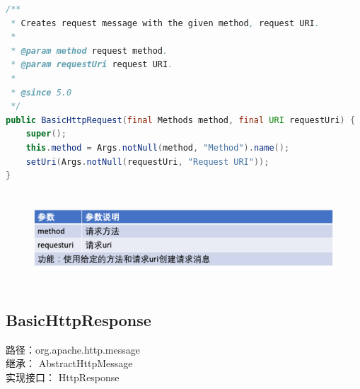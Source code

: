 \documentclass{article}
\begin{document}
	\begin{lstlisting}[language={java}]
/**
 * Creates request message with the given method, request URI.
 *
 * @param method request method.
 * @param requestUri request URI.
 *
 * @since 5.0
 */
public BasicHttpRequest(final Methods method, final URI requestUri) {
    super();
    this.method = Args.notNull(method, "Method").name();
    setUri(Args.notNull(requestUri, "Request URI"));
}

	\end{lstlisting}
	\begin{figure}[H]
		\centering
		\includegraphics[height = 3.5cm, width = 18cm]{pics/20_Request_table_3_6.png}	
	\end{figure}

	\subsection{BasicHttpResponse}
	\begin{CJK}{UTF8}{gbsn}
		路径：org.apache.http.message\\
		继承： AbstractHttpMessage\\
		实现接口： HttpResponse
	\end{CJK}{}
\end{document}

